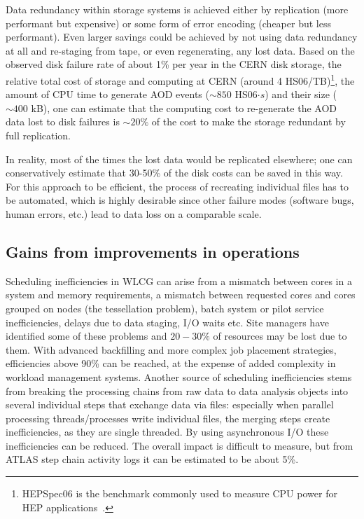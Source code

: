 Data redundancy within storage systems is achieved either by
replication (more performant but expensive) or some form of error
encoding (cheaper but less performant). Even larger savings could be
achieved by not using data redundancy at all and re-staging from tape,
or even regenerating, any lost data.  Based on the observed disk
failure rate of about 1\% per year in the CERN disk storage, the
relative total cost of storage and computing at CERN (around 4
HS06/TB)\footnote{HEPSpec06 is the benchmark commonly used to measure
  CPU power for HEP applications~\cite{hs06}.}, the amount of CPU time
to generate AOD events ($\sim 850$ HS06$\cdot s$) and their size
($\sim 400$ kB), one can estimate that the computing cost to
re-generate the AOD data lost to disk failures is $\sim 20\%$ of the
cost to make the storage redundant by full replication.

In reality, most of the times the lost data would be replicated
elsewhere; one can conservatively estimate that 30-50\% of the disk
costs can be saved in this way. For this approach to be efficient, the
process of recreating individual files has to be automated, which is
highly desirable since other failure modes (software bugs, human
errors, etc.) lead to data loss on a comparable scale.

\subsection{Gains from improvements in operations}
Scheduling inefficiencies in WLCG can arise from a mismatch between
cores in a system and memory requirements, a mismatch between
requested cores and cores grouped on nodes (the tessellation problem),
batch system or pilot service inefficiencies, delays due to data
staging, I/O waits etc. Site managers have identified some of these
problems and $20-30\%$ of resources may be lost due to them. With
advanced backfilling and more complex job placement strategies,
efficiencies above 90\% can be reached, at the expense of added
complexity in workload management systems. Another source of
scheduling inefficiencies stems from breaking the processing chains
from raw data to data analysis objects into several individual steps
that exchange data via files: especially when parallel processing
threads/processes write individual files, the merging steps create
inefficiencies, as they are single threaded. By using asynchronous I/O
these inefficiencies can be reduced. The overall impact is difficult
to measure, but from ATLAS step chain activity logs it can be
estimated to be about 5\%.

